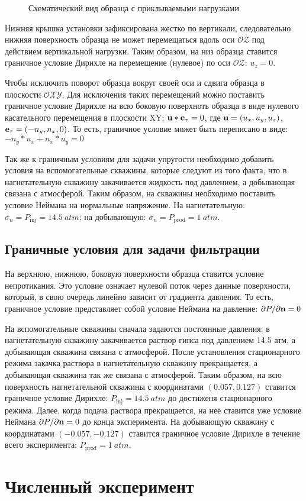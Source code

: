 \begin{figure}[hb]
\begin{center}
\end{center}
\caption{Схематический вид образца с приклываемыми нагрузками}\label{device5:pict}
\end{figure}

Нижняя крышка установки зафиксирована жестко по вертикали, следовательно нижняя поверхность образца не может перемещаться вдоль оси $\mathcal{OZ}$ под действием вертикальной нагрузки. Таким образом, на низ образца ставится граничное условие Дирихле на перемещение (нулевое) по оси  $\mathcal{OZ}$: $u_z = 0$.

Чтобы исключить поворот образца вокруг своей оси и сдвига образца в плоскости $\mathcal{OXY}$. Для исключения таких перемещений можно поставить граничное условие Дирихле на всю боковую поверхноть образца в виде нулевого касательного перемещения в плоскости XY: $\mathbf{u}*\mathbf{e_\tau}=0$, где  $\mathbf{u}=(u_x, u_y, u_z)$, $\mathbf{e_\tau}=(-n_y, n_x, 0)$. То есть, граничное условие может быть переписано в виде: $-n_y*u_x + n_x*u_y=0$

Так же к граничным условиям для задачи упругости необходимо добавить условия на вспомогательные скважины, которые следуют из того факта, что в нагнетательную скважину закачивается жидкость под давлением, а добывающая связана с атмосферой. Таким образом, на скважины необходимо поставить условие Неймана на нормальные напряжение. На нагнетательную: $\sigma_n = P_\text{inj}=14.5~atm$; на добывающую: $\sigma_n =P_\text{prod}=1~atm$.

\subsection{Граничные условия для задачи фильтрации}

На верхнюю, нижнюю, боковую поверхности образца ставится условие непротикания. Это условие означает нулевой поток через данные поверхности, который, в свою очередь линейно зависит от градиента давления. То есть, граничное условие представляет собой условие Неймана на давление: $ \partial P/\partial\mathbf{n} = 0$

На вспомогательные скважины сначала задаются постоянные давления: в нагнетательную скважину закачивается раствор гипса под давлением 14.5 атм, а добывающая скважина связана с атмосферой. После установления стационарного режима закачка раствора в нагнетательную скважину прекращается, а добывающая скважина так же связана с атмосферой. Таким образом, на всю поверхность нагнетательной скважины с координатами  $(0.057, 0.127 )$ ставится граничное условие Дирихле: $P_\text{inj}=14.5~atm$ до достиженя стационарного режима. Далее, когда подача раствора прекращается, на нее ставится уже условие Неймана  $ \partial P/\partial\mathbf{n} = 0$ до конца эксперимента. На добывающую скважину с координатами  $(-0.057, -0.127 )$ ставится граничное условие Дирихле в течение всего эксперимента: $P_\text{prod}=1~atm$.

\section{Численный эксперимент}

